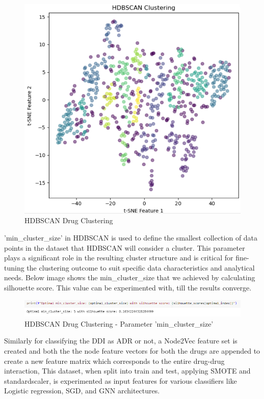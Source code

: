 \documentclass[journal,transmag]{J-NaNA}
\begin{document}
\begin{figure}[htbp]
\centering
\includegraphics[width=\linewidth]{HDBSCAN.png} 
\caption{HDBSCAN Drug Clustering} 
\label{fig: HDBSCAN clustering} %
\end{figure}
 'min\_cluster\_size' in HDBSCAN is used to define the smallest collection of data points in the dataset that HDBSCAN will consider a cluster. This parameter plays a significant role in the resulting cluster structure and is critical for fine-tuning the clustering outcome to suit specific data characteristics and analytical needs. Below image shows the min\_cluster\_size that we achieved by calculating silhouette score. This value can be experimented with, till the results converge. 
\begin{figure}[htbp]
\centering
\includegraphics[width=\linewidth]{min_cluster_size_HDBSCAN.PNG} 
\caption{HDBSCAN Drug Clustering - Parameter 'min\_cluster\_size'} 
\label{fig: HDBSCAN clustering} %
\end{figure}

Similarly for classifying the DDI as ADR or not, a Node2Vec feature set is created and both the the node feature vectors for both the drugs are appended to create a new feature matrix which corresponds to the entire drug-drug interaction, This dataset, when split into train and test, applying SMOTE and standardscaler,
is experimented as input features for various classifiers like Logistic regression, SGD, and GNN architectures.  
\end{document}

